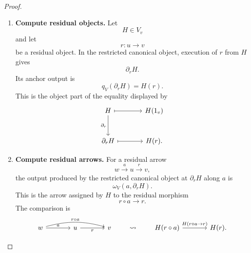 \begin{proof}
    \leavevmode
    \begin{enumerate}
        \item \textbf{Compute residual objects.}
        Let
        \[
            H\in V_v
        \]
        and let
        \[
            r:u\to v
        \]
        be a residual object. In the restricted canonical object, execution of
        \(r\) from \(H\) gives
        \[
            \partial_rH.
        \]
        Its anchor output is
        \[
            q_V(\partial_rH)=H(r).
        \]
        This is the object part of the equality displayed by
        \[
        \begin{tikzcd}[column sep=large, row sep=large]
            H
                \arrow[r, maps to]
                \arrow[d, "{\partial_r}"']
            &
            H(1_v)
            \\
            \partial_rH
                \arrow[r, maps to]
            &
            H(r).
        \end{tikzcd}
        \]

        \item \textbf{Compute residual arrows.}
        For a residual arrow
        \[
            w\xrightarrow{a}u\xrightarrow{r}v,
        \]
        the output produced by the restricted canonical object at
        \(\partial_rH\) along \(a\) is
        \[
            \omega_V(a,\partial_rH).
        \]
        This is the arrow assigned by \(H\) to the residual morphism
        \[
            r\circ a\to r.
        \]
        The comparison is
        \[
        \begin{tikzcd}[column sep=large, row sep=large]
            w
                \arrow[r, "a"]
                \arrow[rr, "r\circ a", bend left=15]
            &
            u
                \arrow[r, "r"']
            &
            v
        \end{tikzcd}
        \qquad
        \leadsto
        \qquad
        \begin{tikzcd}[column sep=large, row sep=large]
            H(r\circ a)
                \arrow[r, "{H(r\circ a\to r)}"]
            &
            H(r).
        \end{tikzcd}
        \]


\end{enumerate}
\end{proof}
